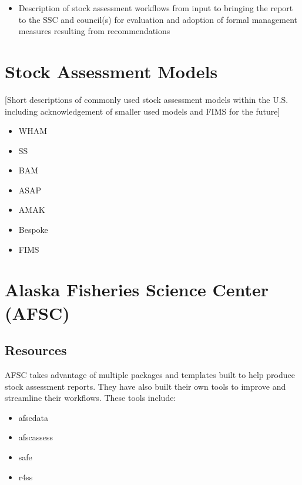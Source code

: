 \documentclass[
  letterpaper,
  oneside,
  open=any]{scrbook}
\providecommand{\tightlist}{%
  \setlength{\itemsep}{0pt}\setlength{\parskip}{0pt}}\usepackage{longtable,booktabs,array}
\begin{document}
\begin{itemize}
\tightlist
\item
  Description of stock assessment workflows from input to bringing the
  report to the SSC and council(s) for evaluation and adoption of formal
  management measures resulting from recommendations
\end{itemize}


\chapter{Stock Assessment Models}\label{stock-assessment-models}

{[}Short descriptions of commonly used stock assessment models within
the U.S. including acknowledgement of smaller used models and FIMS for
the future{]}

\begin{itemize}
\item
  WHAM
\item
  SS
\item
  BAM
\item
  ASAP
\item
  AMAK
\item
  Bespoke
\item
  FIMS
\end{itemize}


\chapter{Alaska Fisheries Science Center
(AFSC)}\label{alaska-fisheries-science-center-afsc}

\section{Resources}\label{resources}

AFSC takes advantage of multiple packages and templates built to help
produce stock assessment reports. They have also built their own tools
to improve and streamline their workflows. These tools include:

\begin{itemize}
\tightlist
\item
  afscdata
\item
  afscassess
\item
  safe
\item
  r4ss
\end{itemize}
\end{document}
